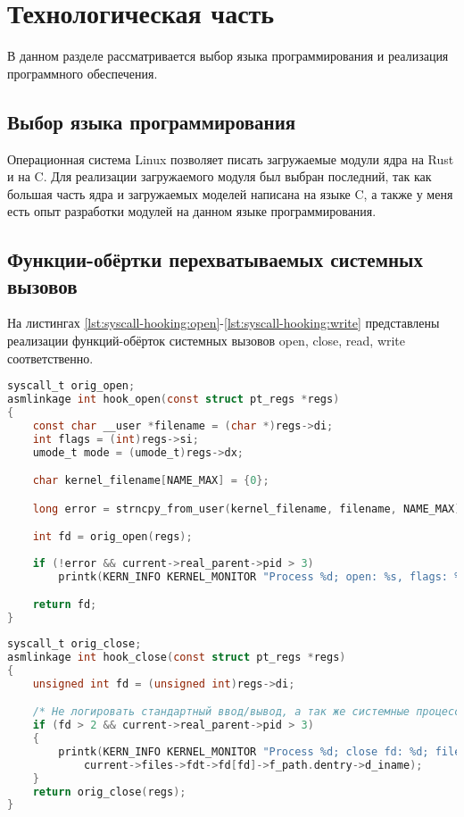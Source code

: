 \chapter{Технологическая часть}
    В данном разделе рассматривается выбор языка программирования 
    и реализация программного обеспечения.

\section{Выбор языка программирования}
    Операционная система Linux позволяет писать загружаемые модули ядра на Rust и на C.
    Для реализации загружаемого модуля был выбран последний, так как
    большая часть ядра и загружаемых моделей написана на языке C, 
    а также у меня есть опыт разработки модулей на данном языке программирования.

\section{Функции-обёртки перехватываемых системных вызовов}
    На листингах \ref{lst:syscall-hooking:open}-\ref{lst:syscall-hooking:write} 
    представлены реализации функций-обёрток системных вызовов open, close, read, write соответственно.

    \begin{lstlisting}[language=C, label=lst:syscall-hooking:open, caption=Функция-обёртка системного вызова open]
syscall_t orig_open;
asmlinkage int hook_open(const struct pt_regs *regs)
{
    const char __user *filename = (char *)regs->di;
    int flags = (int)regs->si;
    umode_t mode = (umode_t)regs->dx;

    char kernel_filename[NAME_MAX] = {0};

    long error = strncpy_from_user(kernel_filename, filename, NAME_MAX);

    int fd = orig_open(regs);
        
    if (!error && current->real_parent->pid > 3)
        printk(KERN_INFO KERNEL_MONITOR "Process %d; open: %s, flags: %x; mode: %x; fd: %d\n", current->pid, kernel_filename, flags, mode, fd);

    return fd;
}
    \end{lstlisting}

    \begin{lstlisting}[language=C, label=lst:syscall-hooking:close, caption=Функция-обёртка системного вызова close]
syscall_t orig_close;
asmlinkage int hook_close(const struct pt_regs *regs)
{
    unsigned int fd = (unsigned int)regs->di;

    /* Не логировать стандартный ввод/вывод, а так же системные процессы */
    if (fd > 2 && current->real_parent->pid > 3)
    {        
        printk(KERN_INFO KERNEL_MONITOR "Process %d; close fd: %d; filename: %s\n", current->pid, fd, 
            current->files->fdt->fd[fd]->f_path.dentry->d_iname);
    }
    return orig_close(regs);
}
    \end{lstlisting}

